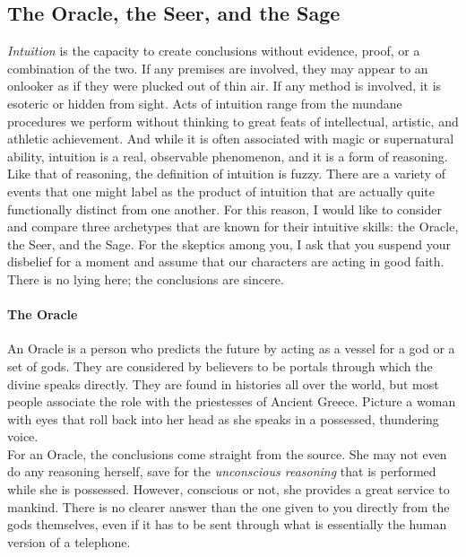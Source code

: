 
\subsection*{The Oracle, the Seer, and the Sage}

\textit{Intuition} is the capacity to create conclusions without evidence, proof, or a combination of the two. If any premises are involved, they may appear to an onlooker as if they were plucked out of thin air. If any method is involved, it is esoteric or hidden from sight. Acts of intuition range from the mundane procedures we perform without thinking to great feats of intellectual, artistic, and athletic achievement. And while it is often associated with magic or supernatural ability, intuition is a real, observable phenomenon, and it is a form of reasoning. \\

Like that of reasoning, the definition of intuition is fuzzy. There are a variety of events that one might label as the product of intuition that are actually quite functionally distinct from one another. For this reason, I would like to consider and compare three archetypes that are known for their intuitive skills: the Oracle, the Seer, and the Sage. For the skeptics among you, I ask that you suspend your disbelief for a moment and assume that our characters are acting in good faith. There is no lying here; the conclusions are sincere. \\

\paragraph{The Oracle} \hspace*{1mm} \vspace*{2mm}

An Oracle is a person who predicts the future by acting as a vessel for a god or a set of gods. They are considered by believers to be portals through which the divine speaks directly. They are found in histories all over the world, but most people associate the role with the priestesses of Ancient Greece. Picture a woman with eyes that roll back into her head as she speaks in a possessed, thundering voice. \\

For an Oracle, the conclusions come straight from the source. She may not even do any reasoning herself, save for the \textit{unconscious reasoning} that is performed while she is possessed. However, conscious or not, she provides a great service to mankind. There is no clearer answer than the one given to you directly from the gods themselves, even if it has to be sent through what is essentially the human version of a telephone. \\

